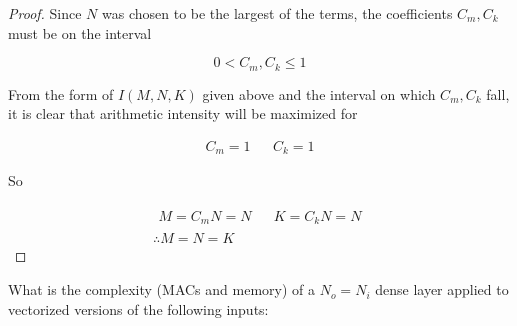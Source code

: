 \documentclass[11pt]{article}
\begin{document}
\begin{enumerate}[(a)]
\begin{proof}
		Since $N$ was chosen to be the largest of the terms, the coefficients
		$C_m, C_k$ must be on the interval

		\begin{equation}
			0 < C_m, C_k \leq 1
		\end{equation}

		From the form of $I(M, N, K)$ given above and the interval on which
		$C_m, C_k$ fall, it is clear that arithmetic intensity will be
		maximized for

		\begin{align}
			C_m = 1 && C_k = 1
		\end{align}

		So

		\begin{gather}
			\begin{align}
				M = C_m N = N && K = C_k N  = N
			\end{align}\\
			\therefore M=N=K
		\end{gather}
	\end{proof}
\end{enumerate}

What is the complexity (MACs and memory) of a $N_o = N_i$ dense layer applied
to vectorized versions of the following inputs:
\end{document}

